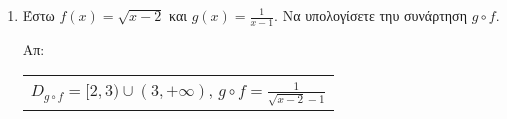 \begin{enumerate}
    \item Έστω $ f(x) = \sqrt{x-2} $ και $ g(x) = \frac{1}{x-1} $. Να υπολογίσετε 
        τηυ συνάρτηση $ g \circ f $.

        \hfill Απ:  \begin{tabular}{l}
            $ D_{g \circ f}= [2,3) \cup (3,+\infty) $, 
            $ g \circ f = \frac{1}{\sqrt{x-2} -1} $
        \end{tabular}
\end{enumerate}












